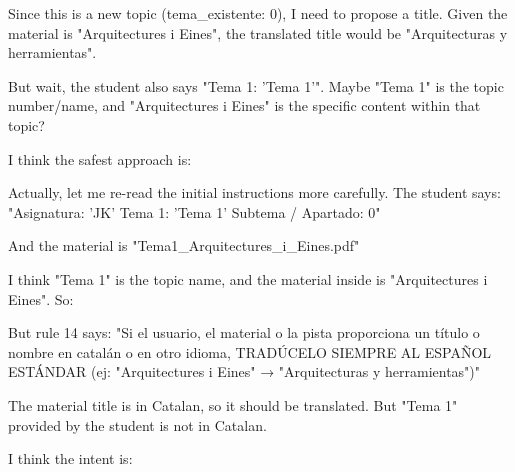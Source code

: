 Since this is a new topic (tema\_existente: 0), I need to propose a title. Given the material is "Arquitectures i Eines", the translated title would be "Arquitecturas y herramientas".

But wait, the student also says "Tema 1: 'Tema 1'". Maybe "Tema 1" is the topic number/name, and "Arquitectures i Eines" is the specific content within that topic?

I think the safest approach is:

Actually, let me re-read the initial instructions more carefully. The student says:
"Asignatura: 'JK'
Tema 1: 'Tema 1'
Subtema / Apartado: 0"

And the material is "Tema1\_Arquitectures\_i\_Eines.pdf"

I think "Tema 1" is the topic name, and the material inside is "Arquitectures i Eines". So:

But rule 14 says: "Si el usuario, el material o la pista proporciona un título o nombre en catalán o en otro idioma, TRADÚCELO SIEMPRE AL ESPAÑOL ESTÁNDAR (ej: "Arquitectures i Eines" → "Arquitecturas y herramientas")"

The material title is in Catalan, so it should be translated. But "Tema 1" provided by the student is not in Catalan.

I think the intent is:

